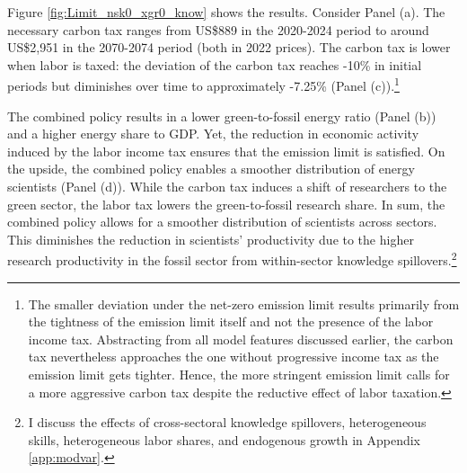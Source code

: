 
Figure \ref{fig:Limit_nsk0_xgr0_know} shows the results.
Consider Panel (a). The necessary carbon tax ranges from US\$889  in the 2020-2024 period to around US\$2,951 in the 2070-2074 period (both in 2022 prices). The carbon tax is lower when labor is taxed: the deviation of the carbon tax reaches -10\% in initial periods but diminishes over time to approximately -7.25\% (Panel (c)).\footnote{ The smaller deviation under the net-zero emission limit results primarily from the tightness of the emission limit itself and not the presence of the labor income tax. Abstracting from all model features discussed earlier, the carbon tax nevertheless approaches the one without progressive income tax as the emission limit gets tighter. Hence, the more stringent emission limit calls for a more aggressive carbon tax despite the reductive effect of labor taxation.}

The combined policy results in a lower green-to-fossil energy ratio (Panel (b)) and a higher energy share to GDP. Yet, the reduction in economic activity induced by the labor income tax ensures that the emission limit is satisfied. On the upside, the combined policy enables a smoother distribution of energy scientists (Panel (d)). While the carbon tax induces a shift of researchers to the green sector, the labor tax lowers the green-to-fossil research share. 
In sum, the combined policy allows for a smoother distribution of scientists across sectors. This diminishes the reduction in scientists' productivity due to the higher research productivity in the fossil sector from within-sector knowledge spillovers.\footnote{ I discuss the effects of cross-sectoral knowledge spillovers, heterogeneous skills, heterogeneous labor shares, and endogenous growth in Appendix \ref{app:modvar}. }
